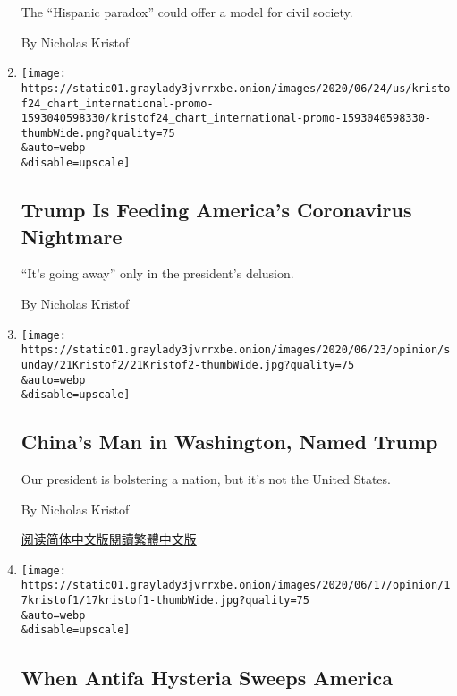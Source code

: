\begin{enumerate}
  The ``Hispanic paradox'' could offer a model for civil society.

  By Nicholas Kristof
\item
  \href{/2020/06/24/opinion/trump-coronavirus.html}{}

  \texttt{[image: https://static01.graylady3jvrrxbe.onion/images/2020/06/24/us/kristof24\_chart\_international-promo-1593040598330/kristof24\_chart\_international-promo-1593040598330-thumbWide.png?quality=75\\\&auto=webp\\\&disable=upscale]}

  \hypertarget{trump-is-feeding-americas-coronavirus-nightmare}{%
  \subsection{Trump Is Feeding America's Coronavirus
  Nightmare}\label{trump-is-feeding-americas-coronavirus-nightmare}}

  ``It's going away'' only in the president's delusion.

  By Nicholas Kristof
\item
  \href{/2020/06/20/opinion/sunday/trump-china-john-bolton-book.html}{}

  \texttt{[image: https://static01.graylady3jvrrxbe.onion/images/2020/06/23/opinion/sunday/21Kristof2/21Kristof2-thumbWide.jpg?quality=75\\\&auto=webp\\\&disable=upscale]}

  \hypertarget{chinas-man-in-washington-named-trump}{%
  \subsection{China's Man in Washington, Named
  Trump}\label{chinas-man-in-washington-named-trump}}

  Our president is bolstering a nation, but it's not the United States.

  By Nicholas Kristof

  \href{https://cn.nytimes3xbfgragh.onion/opinion/20200623/trump-china-john-bolton-book/}{阅读简体中文版}\href{https://cn.nytimes3xbfgragh.onion/opinion/20200623/trump-china-john-bolton-book/zh-hant/}{閱讀繁體中文版}
\item
  \href{/2020/06/17/opinion/antifa-protests.html}{}

  \texttt{[image: https://static01.graylady3jvrrxbe.onion/images/2020/06/17/opinion/17kristof1/17kristof1-thumbWide.jpg?quality=75\\\&auto=webp\\\&disable=upscale]}

  \hypertarget{when-antifa-hysteria-sweeps-america}{%
  \subsection{When Antifa Hysteria Sweeps
  America}\label{when-antifa-hysteria-sweeps-america}}


\end{enumerate}
